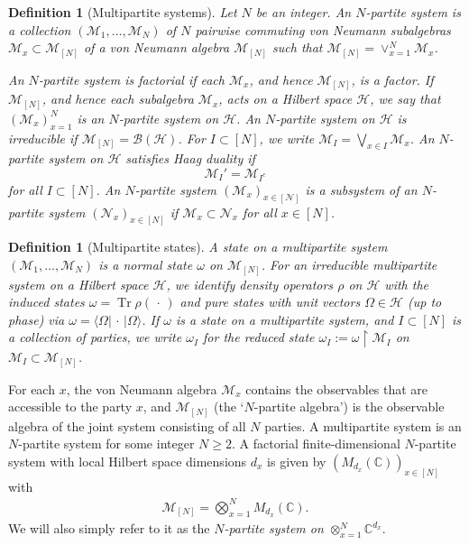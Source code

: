 \documentclass[a4paper, 10pt, onecolumn, accepted=2025-07-22]{quantumarticle}
\newtheorem{definition}[theorem]{Definition}
\theoremstyle{definition}
\newcommand{\ket}[1]{|#1\rangle}
\newcommand{\bra}[1]{\langle#1|}
\newcommand{\mc}{\mathcal}
\DeclareMathOperator{\tr}{Tr}
\def\B{{\mc B}}
\def\CC{{\mathbb C}}
\def\H{{\mc H}}
\def\M{{\mc M}}
\def\N{{\mc N}}
\newcommand*{\1}{\text{\usefont{U}{bbold}{m}{n}1}}
\newcommand{\placeholder}[0]{{\,\cdot\,}}
\begin{document}
\begin{definition}[Multipartite systems]\label{def:N partite}
    Let $N$ be an integer.
    An \emph{$N$-partite system} is a collection $(\M_{1},\ldots,\M_{N})$ of $N$ pairwise commuting von Neumann subalgebras $\M_{x}\subset \M_{[N]}$ of a von Neumann algebra $\M_{[N]}$ such that $\M_{[N]}=\vee_{x=1}^N \M_x$.
    
    An $N$-partite system is \emph{factorial} if each $\M_x$, and hence $\M_{[N]}$, is a factor.
    If $\M_{[N]}$, and hence each subalgebra $\M_x$, acts on a Hilbert space $\H$, we say that $(\M_x)_{x=1}^N$ is an \emph{$N$-partite system on $\H$}.
    An $N$-partite system on $\H$ is \emph{irreducible} if $\M_{[N]}=\B(\H)$.
    For $I \subset [N]$, we write $\M_I = \bigvee_{x\in I} \M_x$.
    An $N$-partite system on $\H$ satisfies \emph{Haag duality} if
    \begin{equation}\label{eq:rHD}
        \M_I' = \M_{I^c}
    \end{equation}
    for all $I\subset [N]$.
    An $N$-partite system $(\M_x)_{x\in[\N]}$ is a \emph{subsystem} of an $N$-partite system $(\N_x)_{x\in[N]}$ if $\M_x\subset \N_x$ for all $x\in[N]$.
\end{definition}

\begin{definition}[Multipartite states]
    A \emph{state} on a multipartite system $(\M_1,\ldots,\M_N)$ is a normal state $\omega$ on $\M_{[N]}$.
    For an irreducible multipartite system on a Hilbert space $\H$, we identify density operators $\rho$ on $\H$ with the induced states $\omega = \tr \rho(\placeholder)$ and pure states with unit vectors $\Omega\in\H$ (up to phase) via $\omega = \bra \Omega\placeholder \ket\Omega$.
    If $\omega$ is a state on a multipartite system, and $I\subset [N]$ is a collection of parties, we write $\omega_I$ for the reduced state $\omega_I :=\omega \upharpoonright \M_I$ on $\M_I\subset\M_{[N]}$.
\end{definition}

For each $x$, the von Neumann algebra $\M_x$ contains the observables that are accessible to the party $x$, and $\M_{[N]}$ (the `$N$-partite algebra') is the observable algebra of the joint system consisting of all $N$ parties.
A multipartite system is an $N$-partite system for some integer $N\ge2$.
A factorial finite-dimensional $N$-partite system with local Hilbert space dimensions $d_x$ is given by $(M_{d_x}(\CC))_{x\in[N]}$ with 
\begin{align}
    \M_{[N]} = \bigotimes_{x=1}^N M_{d_x}(\CC). 
\end{align}
We will also simply refer to it as the \emph{$N$-partite system on $\otimes_{x=1}^N\CC^{d_x}$}. 
\end{document}
